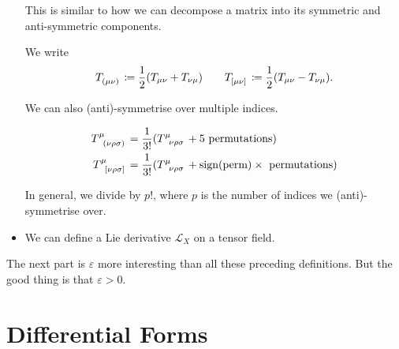 \begin{itemize}
\begin{leftbar}
      \begin{remark}
        This is similar to how we can decompose a matrix into its symmetric and anti-symmetric components.
      \end{remark}
    \end{leftbar}
    \begin{notation}[]
      We write 
      \begin{equation}
	T \indices{_{(\mu \nu)}} \coloneqq \frac{1}{2} (T_{\mu\nu} + T_{\nu \mu}) \qquad
	T \indices{_{[\mu \nu]}} \coloneqq \frac{1}{2} (T_{\mu\nu} - T_{\nu \mu}).
      \end{equation}
    \end{notation}
    We can also (anti)-symmetrise over multiple indices.
    \begin{example}[]
      \begin{align}
	T \indices{^\mu_{(\nu\rho\sigma)}} &= \frac{1}{3!} (T \indices{^\mu_{\nu\rho\sigma}} + 5 \text{ permutations}) \\
      T \indices{^\mu_{[\nu\rho\sigma]}} &= \frac{1}{3!} (T \indices{^\mu_{\nu\rho\sigma}} + \text{sign(perm)} \times \text{ permutations}) \\
      \end{align}
    \end{example}
    In general, we divide by $p!$, where $p$ is the number of indices we (anti)-symmetrise over.
  \item We can define a Lie derivative $\mathcal{L}_X$ on a tensor field.
\end{itemize}

The next part is $\varepsilon$ more interesting than all these preceding definitions. But the good thing is that $\varepsilon > 0$.

\section{Differential Forms}%
\label{sec:differential_forms}

